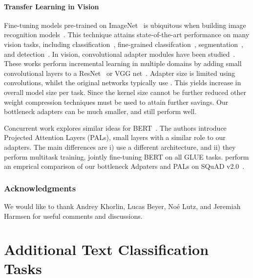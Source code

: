 \documentclass{article}
\begin{document}
\paragraph{Transfer Learning in Vision}
Fine-tuning models pre-trained on ImageNet~\citep{deng2009} is ubiquitous when building image recognition models~\citep{yosinski2014,huh2016makes}.
This technique attains state-of-the-art performance on many vision tasks, including classification~\citep{kornblith2018better}, fine-grained classifcation~\citep{hermans2017}, segmentation~\citep{long2015}, and detection~\citep{girshick2014}.
In vision, convolutional adapter modules have been studied~\citep{rebuffi2017,rebuffi2018,rosenfeld2018incremental}.
These works perform incremental learning in multiple domains by adding small convolutional layers to a ResNet~\citep{he2016} or VGG net~\citep{simonyan2014very}.
Adapter size is limited using  convolutions, whilst the original networks typically use .
This yields  increase in overall model size per task.
Since the kernel size cannot be further reduced other weight compression techniques must be used to attain further savings.
Our bottleneck adapters can be much smaller, and still perform well.

Concurrent work explores similar ideas for BERT~\citep{stickland2019bert}.
The authors introduce Projected Attention Layers (PALs), small layers with a similar role to our adapters.
The main differences are i) \citet{stickland2019bert} use a different architecture,
and ii) they perform multitask training, jointly fine-tuning BERT on all GLUE tasks.
\citet{semnani2019} perform an emprical comparison of our bottleneck Adpaters and PALs on SQuAD v2.0~\citep{rajpurkar2018}.
 
\subsubsection*{Acknowledgments}
We would like to thank Andrey Khorlin, Lucas Beyer,
No\'e Lutz, and Jeremiah Harmsen for useful comments and discussions.





\clearpage

\appendix
\onecolumn


\section{Additional Text Classification Tasks}
\label{appendix:hub_stats}
\end{document}
